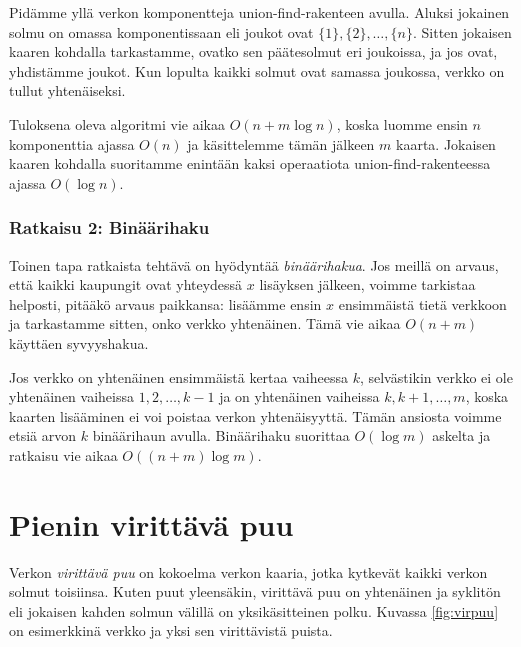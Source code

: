 Pidämme yllä verkon komponentteja
union-find-rakenteen avulla.
Aluksi jokainen solmu on omassa komponentissaan
eli joukot ovat $\{1\},\{2\},\dots,\{n\}$.
Sitten jokaisen kaaren kohdalla tarkastamme,
ovatko sen päätesolmut eri joukoissa,
ja jos ovat, yhdistämme joukot.
Kun lopulta kaikki solmut ovat samassa joukossa,
verkko on tullut yhtenäiseksi.

Tuloksena oleva algoritmi vie aikaa $O(n+m \log n)$,
koska luomme ensin $n$ komponenttia ajassa $O(n)$
ja käsittelemme tämän jälkeen $m$ kaarta.
Jokaisen kaaren kohdalla suoritamme enintään kaksi
operaatiota union-find-rakenteessa ajassa $O(\log n)$.

\subsubsection{Ratkaisu 2: Binäärihaku}

Toinen tapa ratkaista tehtävä on hyödyntää \emph{binäärihakua}.
Jos meillä on arvaus, että kaikki kaupungit ovat yhteydessä
$x$ lisäyksen jälkeen, voimme tarkistaa helposti,
pitääkö arvaus paikkansa:
lisäämme ensin $x$ ensimmäistä tietä verkkoon ja tarkastamme
sitten, onko verkko yhtenäinen. Tämä vie aikaa $O(n+m)$
käyttäen syvyyshakua.

Jos verkko on yhtenäinen ensimmäistä kertaa vaiheessa $k$,
selvästikin verkko ei ole yhtenäinen vaiheissa
$1,2,\dots,k-1$ ja on yhtenäinen vaiheissa $k,k+1,\dots,m$,
koska kaarten lisääminen ei voi poistaa verkon yhtenäisyyttä.
Tämän ansiosta voimme etsiä arvon $k$ binäärihaun avulla.
Binäärihaku suorittaa $O(\log m)$ askelta ja ratkaisu vie
aikaa $O((n+m) \log m)$.

\section{Pienin virittävä puu}

Verkon \emph{virittävä puu} on kokoelma verkon kaaria,
jotka kytkevät kaikki verkon solmut toisiinsa.
Kuten puut yleensäkin, virittävä puu on yhtenäinen ja syklitön eli
jokaisen kahden solmun välillä on yksikäsitteinen polku.
Kuvassa \ref{fig:virpuu} on esimerkkinä verkko ja yksi sen virittävistä puista.

